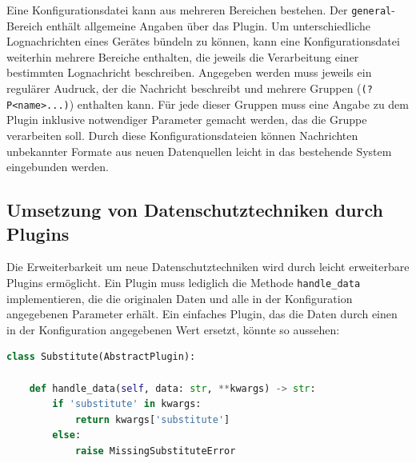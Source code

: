 Eine Konfigurationsdatei kann aus mehreren Bereichen bestehen. Der \texttt{general}-Bereich enthält allgemeine Angaben über das Plugin. Um unterschiedliche Lognachrichten eines Gerätes bündeln zu können, kann eine Konfigurationsdatei weiterhin mehrere Bereiche enthalten, die jeweils die Verarbeitung einer bestimmten Lognachricht beschreiben. Angegeben werden muss jeweils ein regulärer Audruck, der die Nachricht beschreibt und mehrere Gruppen (\texttt{(?P<name>...)}) enthalten kann. Für jede dieser Gruppen muss eine Angabe zu dem Plugin inklusive notwendiger Parameter gemacht werden, das die Gruppe verarbeiten soll. Durch diese Konfigurationsdateien können Nachrichten unbekannter Formate aus neuen Datenquellen leicht in das bestehende System eingebunden werden.

\subsection{Umsetzung von Datenschutztechniken durch Plugins}
\label{sec_integration_in_ossim_plugins}

Die Erweiterbarkeit um neue Datenschutztechniken wird durch leicht erweiterbare Plugins ermöglicht. Ein Plugin muss lediglich die Methode \texttt{handle\_data} implementieren, die die originalen Daten und alle in der Konfiguration angegebenen Parameter erhält. Ein einfaches Plugin, das die Daten durch einen in der Konfiguration angegebenen Wert ersetzt, könnte so aussehen:

\begin{lstlisting}[language=Python]
class Substitute(AbstractPlugin):

    def handle_data(self, data: str, **kwargs) -> str:
        if 'substitute' in kwargs:
            return kwargs['substitute']
        else:
            raise MissingSubstituteError
\end{lstlisting}